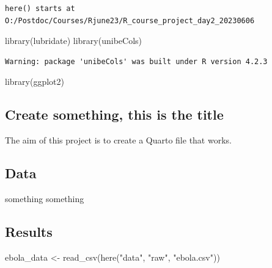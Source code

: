 \documentclass[
  letterpaper,
  DIV=11,
  numbers=noendperiod]{scrartcl}
\newenvironment{Shaded}{\begin{snugshade}}{\end{snugshade}}
\newcommand{\FunctionTok}[1]{\textcolor[rgb]{0.28,0.35,0.67}{#1}}
\newcommand{\NormalTok}[1]{\textcolor[rgb]{0.00,0.23,0.31}{#1}}
\newcommand{\OtherTok}[1]{\textcolor[rgb]{0.00,0.23,0.31}{#1}}
\newcommand{\StringTok}[1]{\textcolor[rgb]{0.13,0.47,0.30}{#1}}
\begin{document}
\begin{verbatim}
here() starts at O:/Postdoc/Courses/Rjune23/R_course_project_day2_20230606
\end{verbatim}

\begin{Shaded}
\begin{Highlighting}[]
\FunctionTok{library}\NormalTok{(lubridate)}
\FunctionTok{library}\NormalTok{(unibeCols)}
\end{Highlighting}
\end{Shaded}

\begin{verbatim}
Warning: package 'unibeCols' was built under R version 4.2.3
\end{verbatim}

\begin{Shaded}
\begin{Highlighting}[]
\FunctionTok{library}\NormalTok{(ggplot2)}
\end{Highlighting}
\end{Shaded}

\hypertarget{create-something-this-is-the-title}{%
\subsection{Create something, this is the
title}\label{create-something-this-is-the-title}}

The aim of this project is to create a Quarto file that works.

\hypertarget{data}{%
\subsection{Data}\label{data}}

something something

\hypertarget{results}{%
\subsection{Results}\label{results}}

\begin{Shaded}
\begin{Highlighting}[]
\NormalTok{ebola\_data }\OtherTok{\textless{}{-}} \FunctionTok{read\_csv}\NormalTok{(}\FunctionTok{here}\NormalTok{(}\StringTok{"data"}\NormalTok{, }\StringTok{"raw"}\NormalTok{, }\StringTok{"ebola.csv"}\NormalTok{))}
\end{Highlighting}
\end{Shaded}
\end{document}
